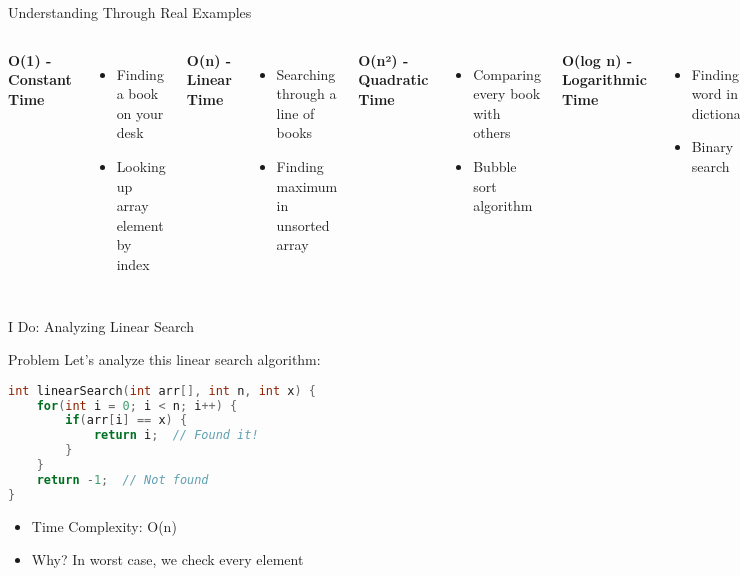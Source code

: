 \documentclass{beamer}
\begin{document}
\begin{frame}{Understanding Through Real Examples}
    \begin{columns}
        \textbf{O(1) - Constant Time}
        \begin{itemize}
            \item Finding a book on your desk
            \item Looking up array element by index
        \end{itemize}
        
        \textbf{O(n) - Linear Time}
        \begin{itemize}
            \item Searching through a line of books
            \item Finding maximum in unsorted array
        \end{itemize}
        
        \textbf{O(n²) - Quadratic Time}
        \begin{itemize}
            \item Comparing every book with others
            \item Bubble sort algorithm
        \end{itemize}
        
        \textbf{O(log n) - Logarithmic Time}
        \begin{itemize}
            \item Finding word in dictionary
            \item Binary search
        \end{itemize}
    \end{columns}
\end{frame}

\begin{frame}[fragile]{I Do: Analyzing Linear Search}
    \begin{block}{Problem}
        Let's analyze this linear search algorithm:
    \end{block}
    \begin{lstlisting}[language=C++, basicstyle=\small]
int linearSearch(int arr[], int n, int x) {
    for(int i = 0; i < n; i++) {
        if(arr[i] == x) {
            return i;  // Found it!
        }
    }
    return -1;  // Not found
}
    \end{lstlisting}
    \begin{itemize}
        \item Time Complexity: O(n)
        \item Why? In worst case, we check every element
    \end{itemize}
\end{frame}
\end{document}
